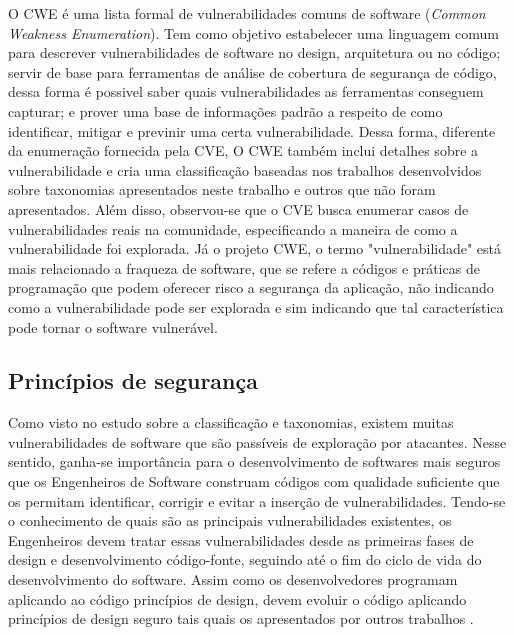 %

O CWE é uma lista formal de vulnerabilidades comuns de software (\emph{Common Weakness Enumeration}). Tem como objetivo estabelecer uma linguagem comum para descrever vulnerabilidades de software no design, arquitetura ou no código; servir de base para ferramentas de análise de cobertura de segurança de código, dessa forma é possivel saber quais vulnerabilidades as ferramentas conseguem capturar; e prover uma base de informações padrão a respeito de como identificar, mitigar e previnir uma certa vulnerabilidade. Dessa forma, diferente da enumeração fornecida pela CVE, O CWE também inclui detalhes sobre a vulnerabilidade e cria uma classificação baseadas nos trabalhos desenvolvidos sobre taxonomias apresentados neste trabalho e outros que não foram apresentados. Além disso, observou-se que o CVE busca enumerar casos de vulnerabilidades reais na comunidade, especificando a maneira de como a vulnerabilidade foi explorada. Já o projeto CWE, o termo "vulnerabilidade" está mais relacionado a fraqueza de software, que se refere a códigos e práticas de programação que podem oferecer risco a segurança da aplicação, não indicando como a vulnerabilidade pode ser explorada e sim indicando que tal característica pode tornar o software vulnerável.

%

\subsection{Princípios de segurança}
\label{sec-security-principles}

Como visto no estudo sobre a classificação e taxonomias, existem muitas vulnerabilidades de software que são passíveis de exploração por atacantes. Nesse sentido, ganha-se importância para o desenvolvimento de softwares mais seguros que os Engenheiros de Software construam códigos com qualidade suficiente que os permitam identificar, corrigir e evitar a inserção de vulnerabilidades. Tendo-se o conhecimento de quais são as principais vulnerabilidades existentes, os Engenheiros devem tratar essas vulnerabilidades desde as primeiras fases de design e desenvolvimento código-fonte, seguindo até o fim do ciclo de vida do desenvolvimento do software. Assim como os desenvolvedores programam aplicando ao código princípios de design, devem evoluir o código aplicando princípios de design seguro tais quais os apresentados por outros trabalhos \cite{saltzer1975} \cite{bishop2003} \cite{mcgraw2002} \cite{a1lshammari2009}.

